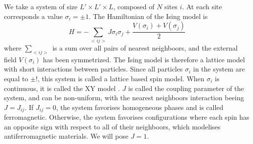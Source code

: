 {\color{blue}
We take a system of size $L'\times L' \times L$, composed of $N$ sites $i$. At each site corresponds a value $\sigma_i =\pm1$. The Hamiltonian of the Ising model is 
\begin{equation}
	H =  - \sum_{<i j >} J \sigma_i \sigma_j + \frac{V(\sigma_i)+V(\sigma_j)}{2}
	\label{hamil-ising}
\end{equation}
where $\sum_{< ij >}$ is a sum over all pairs of nearest neighboors, and the external field $V(\sigma_i)$ has been symmetrized. The Ising model\cite{niss_history_2005,niss_history_2009} is therefore a lattice model with short interactions between particles. Since all particles $\sigma_i$ in the system are equal to $\pm!$, this system is called a lattice based spin model. When $\sigma_i$ is continuous, it is called the XY model \cite{gupta_phase_1988}.
$J$ is called the coupling parameter of the system, and can be non-uniform, with the nearest neighboors interaction beeing $J = J_{ij}$. If $ J_{ij} =0$, the system favorises homogeneous phases and is called ferromagnetic. Otherwise, the system favorises configurations where each spin has an opposite sign with respect to all of their neighboors, which modelises antiferromagnetic materials. We will pose $J=1$.

}
